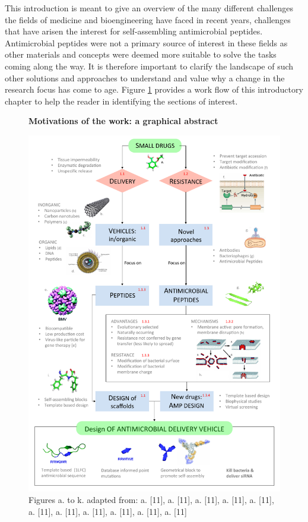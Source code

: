 \vspace{1cm}
This introduction is meant to give an overview of the many different challenges the fields of medicine and bioengineering have faced in recent years, challenges that have arisen the interest for self-assembling antimicrobial peptides. Antimicrobial peptides were not a primary source of interest in these fields as other materials and concepts were deemed more suitable to solve the tasks coming along the way. It is therefore important to clarify the landscape of such other solutions and approaches to understand and value why a change in the research focus has come to age. Figure \ref{fig:intro} provides a work flow of this introductory chapter to help the reader in identifying the sections of interest.

\begin{figure}
\begin{center}
\Large{\textbf{Motivations of the work: a graphical abstract}}\par\bigskip
\includegraphics[width = \textwidth]{pics/scheme_intro}
\caption{Figures a. to k. adapted from: a. [11], a. [11], a. [11], a. [11], a. [11], a. [11], a. [11], a. [11], a. [11], a. [11], a. [11]} \label{fig:intro}
\end{center}
\end{figure}

